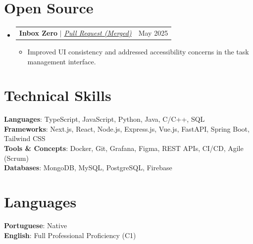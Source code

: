 \documentclass[letterpaper,11pt]{article}
\makeatletter
\newcommand{\resumeItem}[1]{
  \item\small{
    {#1 \vspace{-2pt}}
  }
}
\newcommand{\resumeProjectHeading}[2]{
    \item
    \begin{tabular*}{0.97\textwidth}{l@{\extracolsep{\fill}}r}
      \small#1 & #2 \\
    \end{tabular*}\vspace{-7pt}
}
\newcommand{\resumeSubHeadingListStart}{\begin{itemize}[leftmargin=0.15in, label={}]}
\newcommand{\resumeSubHeadingListEnd}{\end{itemize}}
\newcommand{\resumeItemListStart}{\begin{itemize}}
\newcommand{\resumeItemListEnd}{\end{itemize}\vspace{-5pt}}
\makeatother
\begin{document}
\section{Open Source}
    \resumeSubHeadingListStart
      \resumeProjectHeading
          {\textbf{Inbox Zero} $|$ \href{https://github.com/elie222/inbox-zero/pull/390}{\emph{Pull Request (Merged)}}}{May 2025}
          \resumeItemListStart
            \resumeItem{Improved UI consistency and addressed accessibility concerns in the task management interface.}
          \resumeItemListEnd
    \resumeSubHeadingListEnd

\section{Technical Skills}
 \begin{itemize}[leftmargin=0.15in, label={}]
    \small{\item{
     \textbf{Languages}{: TypeScript, JavaScript, Python, Java, C/C++, SQL} \\
     \textbf{Frameworks}{: Next.js, React, Node.js, Express.js, Vue.js, FastAPI, Spring Boot, Tailwind CSS} \\
     \textbf{Tools \& Concepts}{: Docker, Git, Grafana, Figma, REST APIs, CI/CD, Agile (Scrum)} \\
     \textbf{Databases}{: MongoDB, MySQL, PostgreSQL, Firebase}
    }}
 \end{itemize}
\section{Languages}
 \begin{itemize}[leftmargin=0.15in, label={}]
    \small{\item{
     \textbf{Portuguese}{: Native} \\
     \textbf{English}{: Full Professional Proficiency (C1)} \\
    }}
 \end{itemize}
 
\end{document}
